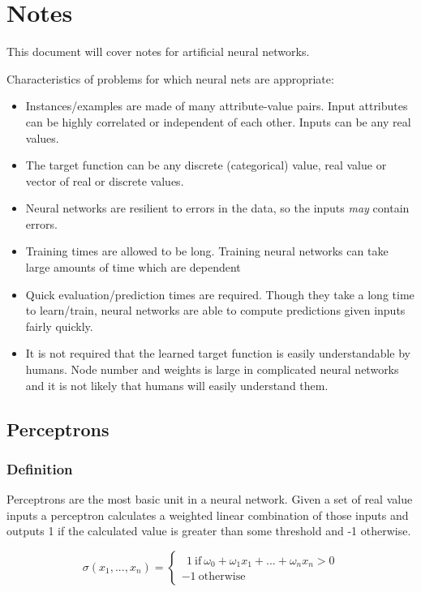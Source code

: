 \documentclass{article}
\begin{document}
	
	\section{Notes}
	
	This document will cover notes for artificial neural networks.
	
	Characteristics of problems for which neural nets are appropriate:
	
	\begin{itemize}
		\item Instances/examples are made of many attribute-value pairs. Input attributes can be highly correlated or independent of each other. Inputs can be any real values.
		\item The target function can be any discrete (categorical) value, real value or vector of real or discrete values.
		\item Neural networks are resilient to errors in the data, so the inputs \textit{may} contain errors.
		\item Training times are allowed to be long. Training neural networks can take large amounts of time which are dependent 
		\item Quick evaluation/prediction times are required. Though they take a long time to learn/train, neural networks are able to compute predictions given inputs fairly quickly.
		\item It is not required that the learned target function is easily understandable by humans. Node number and weights is large in complicated neural networks and it is not likely that humans will easily understand them.
	\end{itemize}

	\subsection{Perceptrons}
	
	\subsubsection{Definition}
	
	Perceptrons are the most basic unit in a neural network. Given a set of real value inputs a perceptron calculates a weighted linear combination of those inputs and outputs 1 if the calculated value is greater than some threshold and -1 otherwise. 
	
	\[ \sigma(x_{1},...,x_{n}) = \begin{cases}
	~~1 ~\text{if} ~\omega_{0} + \omega_{1}x_{1} + ... + \omega_{n}x_{n} > 0 \\
	-1 ~\text{otherwise}
	\end{cases} \]
	
\end{document}
